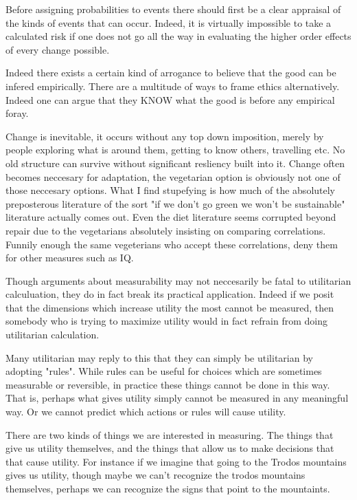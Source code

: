 \documentclass[12pt]{report}
\numberwithin{equation}{section}
\begin{document}
Before assigning probabilities to events there should first be a clear appraisal of the kinds of events that can occur. Indeed, it is virtually impossible to take a calculated risk if one does not go all the way in evaluating the higher order effects of every change possible. 

Indeed there exists a certain kind of arrogance to believe that the good can be infered empirically. There are a multitude of ways to frame ethics alternatively. Indeed one can argue that they KNOW what the good is before any empirical foray. 

Change is inevitable, it occurs without any top down imposition, merely by people exploring what is around them, getting to know others, travelling etc. No old structure can survive without significant resliency built into it. Change often becomes neccesary for adaptation, the vegetarian option is obviously not one of those neccesary options. What I find stupefying is how much of the absolutely preposterous literature of the sort "if we don't go green we won't be sustainable"  literature actually comes out. Even the diet literature seems corrupted beyond repair due to the vegetarians absolutely insisting on comparing correlations. Funnily enough the same vegeterians who accept these correlations, deny them for other measures such as IQ. 

Though arguments about measurability may not neccesarily be fatal to utilitarian calculuation, they do in fact break its practical application. Indeed if we posit that the dimensions which increase utility the most cannot be measured, then somebody who is trying to maximize utility would in fact refrain from doing utilitarian calculation. 

Many utilitarian may reply to this that they can simply be utilitarian by adopting "rules". While rules can be useful for choices which are sometimes measurable or reversible, in practice these things cannot be done in this way. That is, perhaps what gives utility simply cannot be measured in any meaningful way. Or we cannot predict which actions or rules will cause utility. 


There are two kinds of things we are interested in measuring. The things that give us utility themselves, and the things that allow us to make decisions that that cause utility. For instance if we imagine that going to the Trodos mountains gives us utility, though maybe we can't recognize the trodos mountains themselves, perhaps we can recognize the signs that point to the mountaints. 
\end{document}
